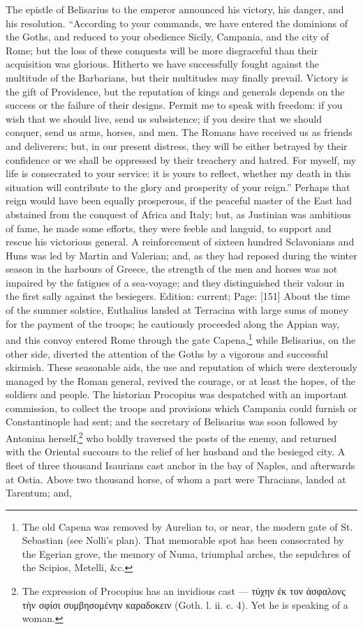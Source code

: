 The epistle of Belisarius to the emperor announced his victory, his danger, and his resolution. \texthebrew{“}According to your commands, we have entered the dominions of the Goths, and reduced to your obedience Sicily, Campania, and the city of Rome; but the loss of these conquests will be more disgraceful than their acquisition was glorious. Hitherto we have successfully fought against the multitude of the Barbarians, but their multitudes may finally prevail. Victory is the gift of Providence, but the reputation of kings and generals depends on the success or the failure of their designs. Permit me to speak with freedom: if you wish that we should live, send us subsistence; if you desire that we should conquer, send us arms, horses, and men. The Romans have received us as friends and deliverers; but, in our present distress, they will be either betrayed by their confidence or we shall be oppressed by their treachery and hatred. For myself, my life is consecrated to your service: it is yours to reflect, whether my death in this situation will contribute to the glory and prosperity of your reign.\texthebrew{}” Perhaps that reign would have been equally prosperous, if the peaceful master of the East had abstained from the conquest of Africa and Italy; but, as Justinian was ambitious of fame, he made some efforts, they were feeble and languid, to support and rescue his victorious general. A reinforcement of sixteen hundred Sclavonians and Huns was led by Martin and Valerian; and, as they had reposed during the winter season in the harbours of Greece, the strength of the men and horses was not impaired by the fatigues of a sea-voyage; and they distinguished their valour in the first sally against the besiegers. Edition: current; Page: [151] About the time of the summer solstice, Euthalius landed at Terracina with large sums of money for the payment of the troops; he cautiously proceeded along the Appian way, and this convoy entered Rome through the gate Capena,\footnote{The old Capena was removed by Aurelian to, or near, the modern gate of St. Sebastian (see Nolli\texthebrew{}’s plan). That memorable spot has been consecrated by the Egerian grove, the memory of Numa, triumphal arches, the sepulchres of the Scipios, Metelli, \&c.} while Belisarius, on the other side, diverted the attention of the Goths by a vigorous and successful skirmish. These seasonable aids, the use and reputation of which were dexterously managed by the Roman general, revived the courage, or at least the hopes, of the soldiers and people. The historian Procopius was despatched with an important commission, to collect the troops and provisions which Campania could furnish or Constantinople had sent; and the secretary of Belisarius was soon followed by Antonina herself,\footnote{The expression of Procopius has an invidious cast \texthebrew{—} \textgreek{τύχην \texthebrew{ἐ}κ τον \texthebrew{ἀ}σφαλονς τ\texthebrew{ὴ}ν σφίσι συμβησομένην καραδοκειν} (Goth. l. ii. c. 4). Yet he is speaking of a woman.} who boldly traversed the posts of the enemy, and returned with the Oriental succours to the relief of her husband and the besieged city. A fleet of three thousand Isaurians cast anchor in the bay of Naples, and afterwards at Ostia. Above two thousand horse, of whom a part were Thracians, landed at Tarentum; and, 
